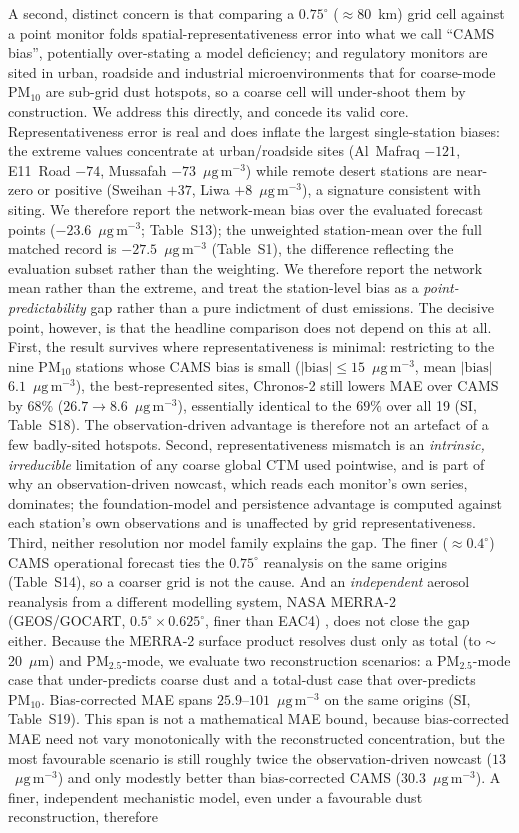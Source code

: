 \documentclass[review,times,authoryear]{elsarticle}
\newcommand*{\ugm}{\ensuremath{\mu\mathrm{g\,m^{-3}}}}
\newcommand*{\pmten}{\ensuremath{\mathrm{PM_{10}}}}
\begin{document}
A second, distinct concern is that comparing a $0.75^\circ$ ($\approx$80~km) grid cell against a point monitor folds spatial-representativeness error into what we call ``CAMS bias'', potentially over-stating a model deficiency; and regulatory monitors are sited in urban, roadside and industrial microenvironments that for coarse-mode \pmten{} are sub-grid dust hotspots, so a coarse cell will under-shoot them by construction. We address this directly, and concede its valid core. Representativeness error is real and does inflate the largest single-station biases: the extreme values concentrate at urban/roadside sites (Al~Mafraq $-121$, E11~Road $-74$, Mussafah $-73$~\ugm) while remote desert stations are near-zero or positive (Sweihan $+37$, Liwa $+8$~\ugm), a signature consistent with siting. We therefore report the network-mean bias over the evaluated forecast points ($-23.6$~\ugm; Table~S13); the unweighted station-mean over the full matched record is $-27.5$~\ugm{} (Table~S1), the difference reflecting the evaluation subset rather than the weighting. We therefore report the network mean rather than the extreme, and treat the station-level bias as a \emph{point-predictability} gap rather than a pure indictment of dust emissions. The decisive point, however, is that the headline comparison does not depend on this at all. First, the result survives where representativeness is minimal: restricting to the nine \pmten{} stations whose CAMS bias is small ($|\text{bias}|\leq15$~\ugm, mean $|\text{bias}|$ $6.1$~\ugm), the best-represented sites, Chronos-2 still lowers MAE over CAMS by $68\%$ ($26.7\rightarrow8.6$~\ugm), essentially identical to the $69\%$ over all 19 (SI, Table~S18). The observation-driven advantage is therefore not an artefact of a few badly-sited hotspots. Second, representativeness mismatch is an \emph{intrinsic, irreducible} limitation of any coarse global CTM used pointwise, and is part of why an observation-driven nowcast, which reads each monitor's own series, dominates; the foundation-model and persistence advantage is computed against each station's own observations and is unaffected by grid representativeness. Third, neither resolution nor model family explains the gap. The finer ($\approx0.4^\circ$) CAMS operational forecast ties the $0.75^\circ$ reanalysis on the same origins (Table~S14), so a coarser grid is not the cause. And an \emph{independent} aerosol reanalysis from a different modelling system, NASA MERRA-2 (GEOS/GOCART, $0.5^\circ\times0.625^\circ$, finer than EAC4) \citep{gelaro2017,randles2017}, does not close the gap either. Because the MERRA-2 surface product resolves dust only as total (to $\sim$20~$\mu$m) and PM$_{2.5}$-mode, we evaluate two reconstruction scenarios: a PM$_{2.5}$-mode case that under-predicts coarse dust and a total-dust case that over-predicts \pmten{}. Bias-corrected MAE spans $25.9$--$101$~\ugm{} on the same origins (SI, Table~S19). This span is not a mathematical MAE bound, because bias-corrected MAE need not vary monotonically with the reconstructed concentration, but the most favourable scenario is still roughly twice the observation-driven nowcast ($13$~\ugm) and only modestly better than bias-corrected CAMS ($30.3$~\ugm). A finer, independent mechanistic model, even under a favourable dust reconstruction, therefore 
\end{document}
